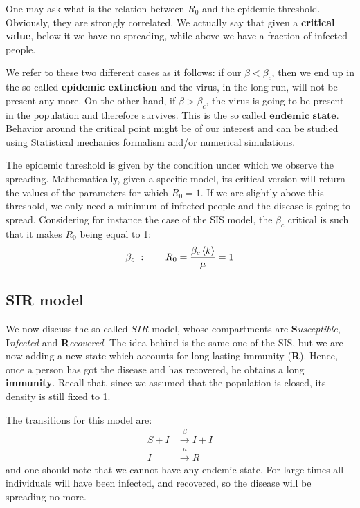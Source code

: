 \documentclass[../main/main.tex]{subfiles}
\begin{document}
One may ask what is the relation between \( R_0 \) and the epidemic threshold. Obviously, they are strongly correlated. We actually say that given a \textbf{critical value}, below it we have no spreading, while above we have a fraction of infected people.

We refer to these two different cases as it follows: if our $\beta < \beta_c$, then we end up in the so called \textbf{epidemic extinction} and the virus, in the long run, will not be present any more. On the other hand, if $\beta > \beta_c$, the virus is going to be present in the population and therefore survives. This is the so called $\textbf{endemic state}$. Behavior around the critical point might be of our interest and can be studied using Statistical mechanics formalism and/or numerical simulations. 

The epidemic threshold is given by the condition under which we observe the spreading. Mathematically, given a specific model, its critical version will return the values of the parameters for which $ R_0 = 1 $. If we are slightly above this threshold, we only need a minimum of infected people and the disease is going to spread. Considering for instance the case of the SIS model, the $\beta_c$ critical is such that it makes $R_0$ being equal to 1:
\begin{equation}
\beta_c\ :  \qquad  R_0 = \frac{\beta_c \expval{k} }{\mu } = 1
\end{equation}


\subsection{SIR model}
We now discuss the so called $SIR$ model, whose compartments are \textbf{S}\textit{usceptible}, \textbf{I}\textit{nfected} and \textbf{R}\textit{ecovered}. The idea behind is the same one of the SIS, but we are now adding a new state which accounts for long lasting immunity (\textbf{R}). Hence, once a person has got the disease and has recovered, he obtains a long \textbf{immunity}. Recall that, since we assumed that the population is closed, its density is still fixed to 1.

The transitions for this model are:
\begin{equation}
\begin{split}
  S + I &\overset{\beta }{\rightarrow } I + I  \\
  I &\overset{\mu }{\rightarrow } R
\end{split}
\end{equation}
and one should note that we cannot have any endemic state. For large times all individuals will have been infected, and recovered, so the disease will be spreading no more.
\end{document}
